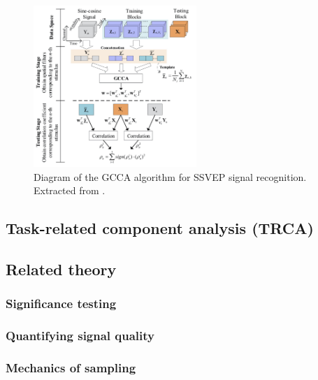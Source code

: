 \begin{figure}[h]
    \centering
    \includegraphics[width=0.55\textwidth]{gcca}
    \caption[Overview of the generalised CCA (GCCA) algorithm]{Diagram of the GCCA algorithm for SSVEP signal recognition. Extracted from \cite{sun-gcca}.}
    \label{fig:gcca}
\end{figure}

\subsection{Task-related component analysis (TRCA)}

\subsection{Related theory}
\subsubsection{Significance testing}
\subsubsection{Quantifying signal quality}
\subsubsection{Mechanics of sampling}